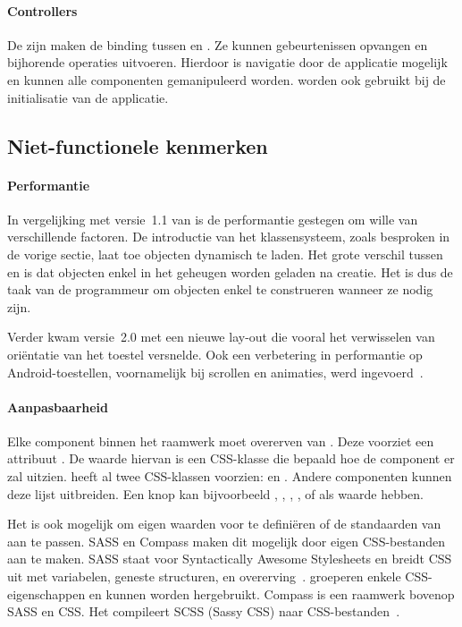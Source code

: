 \paragraph{Controllers} 
De  zijn maken de binding tussen  en .
Ze kunnen gebeurtenissen opvangen en bijhorende operaties uitvoeren.
Hierdoor is navigatie door de applicatie mogelijk en kunnen alle componenten gemanipuleerd worden.
 worden ook gebruikt bij de initialisatie van de applicatie.

\subsection{Niet-functionele kenmerken}
\paragraph{Performantie}
In vergelijking met versie~1.1 van \st{} is de performantie gestegen om wille van verschillende factoren.  
De introductie van het klassensysteem,  zoals besproken in de vorige sectie,  laat toe objecten dynamisch te laden. 
Het grote verschil tussen  en  is dat objecten enkel in het geheugen worden geladen na creatie.  
Het is dus de taak van de programmeur om objecten enkel te construeren wanneer ze nodig zijn.

Verder kwam versie~2.0 met een nieuwe lay-out  die vooral het verwisselen van oriëntatie van het toestel versnelde.  
Ook een verbetering in performantie op Android-toestellen,  voornamelijk bij scrollen en animaties,  werd ingevoerd~\cite{Inc.}.

\paragraph{Aanpasbaarheid}
\label{sec:sencha-aanpasbaarheid}
Elke component binnen het raamwerk moet overerven van .  
Deze voorziet een attribuut .  
De waarde hiervan is een CSS-klasse die bepaald hoe de component er zal uitzien.  
\st{} heeft al twee CSS-klassen voorzien:   en .  
Andere componenten kunnen deze lijst uitbreiden.  
Een knop kan bijvoorbeeld ,  ,  ,  ,   of  als  waarde hebben.

Het is ook mogelijk om eigen waarden voor  te definiëren of de standaarden van \st{} aan te passen.  
SASS en Compass maken dit mogelijk door eigen CSS-bestanden aan te maken.  
SASS staat voor Syntactically Awesome Stylesheets en breidt CSS uit met variabelen,  geneste structuren,  en overerving~\cite{Eppstein2013}.  
 groeperen enkele CSS-eigenschappen en kunnen worden hergebruikt.  
Compass is een raamwerk bovenop SASS en CSS.  
Het compileert SCSS (Sassy CSS) naar CSS-bestanden~\cite{Eppstein2013a}.        


